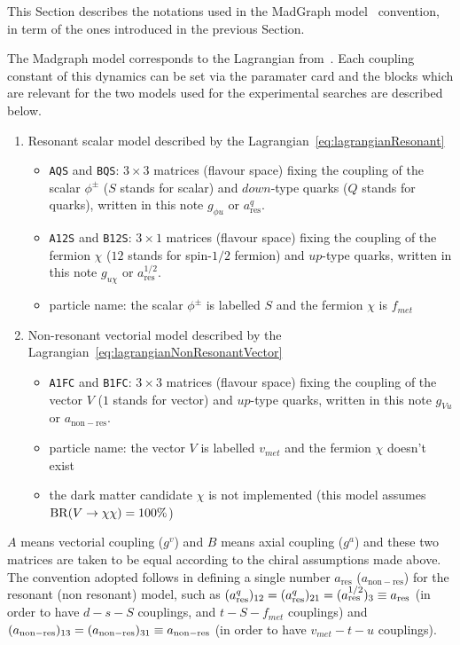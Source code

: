 

This Section describes the notations used in the MadGraph model~\cite{MGmodel} convention, 
in term of the ones introduced in the previous Section.

The Madgraph model corresponds to the Lagrangian from~\cite{AndreaFuksMaltoni}. 
Each coupling constant of this dynamics can be set via the paramater card and 
the blocks which are relevant for the two models used for the experimental searches are described below.

\begin{enumerate}

\item Resonant scalar model described by the Lagrangian~\eqref{eq:lagrangianResonant}
  \begin{itemize}
  \item \texttt{AQS} and \texttt{BQS}: $3\times 3$ matrices (flavour space) fixing the coupling of the scalar $\phi^{\pm}$ ($S$ stands for scalar) and $down$-type 
    quarks ($Q$ stands for quarks), written in this note $g_{\phi u}$ or $a^{q}_{\mathrm{res}}$.
  \item \texttt{A12S} and \texttt{B12S}: $3\times 1$ matrices (flavour space) fixing the coupling of the fermion $\chi$ ($12$ stands for spin-$1/2$ fermion) 
    and $up$-type quarks, written in this note $g_{u \chi}$ or $a^{1/2}_{\mathrm{res}}$.
  \item particle name: the scalar $\phi^{\pm}$ is labelled $S$ and the fermion $\chi$ is $f_{met}$
  \end{itemize}  
  
\item Non-resonant vectorial model described by the Lagrangian~\eqref{eq:lagrangianNonResonantVector}
\begin{itemize}
\item \texttt{A1FC} and \texttt{B1FC}: $3\times 3$ matrices (flavour space) fixing the coupling of the vector $V$ 
  ($1$ stands for vector) and $up$-type quarks, written in this note $g_{Vu}$ or $a_{\mathrm{non-res}}$.
\item particle name: the vector $V$ is labelled $v_{met}$ and the fermion $\chi$ doesn't exist
\item the dark matter candidate $\chi$ is not implemented (this model assumes $\mathrm{BR}({V} \to {\chi\chi})=100\%$)
\end{itemize}

\end{enumerate}
% 
$A$ means vectorial coupling ($g^{v}$) and $B$ means axial coupling ($g^{a}$) and these two matrices 
are taken to be equal according to the chiral assumptions made above. 
The convention adopted follows \cite{ATLASmonotop} in defining 
a single number $a_{\mathrm{res}}$ ($a_{\mathrm{non-res}}$) 
for the resonant (non resonant) model, such as $(a_{\mathrm{res}}^q)_{\mathrm{12}}=(a_{\mathrm{res}}^q)_{\mathrm{21}}=(a_{\mathrm{res}}^{1/2})_{\mathrm{3}}\equiv a_{\mathrm{res}}$ 
(in order to have $d-s-S$ couplings, and $t-S-f_{met}$ couplings) 
and $(a_{\mathrm{non-res}})_{\mathrm{13}}=(a_{\mathrm{non-res}})_{\mathrm{31}}\equiv a_{\mathrm{non-res}}$ (in order to have $v_{met}-t-u$ couplings). 

